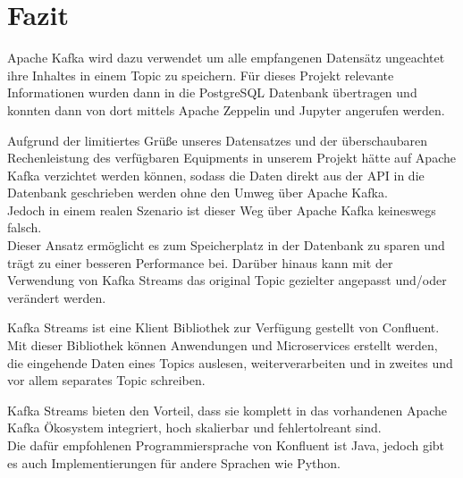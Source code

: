 \chapter{Fazit}
\label{chap:fazit}


Apache Kafka wird dazu verwendet um alle empfangenen Datensätz ungeachtet ihre Inhaltes in einem Topic zu speichern.
Für dieses Projekt relevante Informationen wurden dann in die PostgreSQL Datenbank übertragen und konnten dann von dort mittels
Apache Zeppelin und Jupyter angerufen werden.

Aufgrund der limitiertes Grüße unseres Datensatzes und der überschaubaren Rechenleistung des verfügbaren Equipments in unserem Projekt
hätte auf Apache Kafka verzichtet werden können, sodass die Daten direkt aus der \ac{API} in die Datenbank geschrieben werden
ohne den \glqq Umweg\grqq{} über Apache Kafka.\\
Jedoch in einem realen Szenario ist dieser Weg über Apache Kafka keineswegs falsch.\\
Dieser Ansatz ermöglicht es zum Speicherplatz in der Datenbank zu sparen und trägt zu einer besseren Performance bei.
Darüber hinaus kann mit der Verwendung von Kafka Streams das original Topic gezielter angepasst und/oder verändert werden.

Kafka Streams ist eine Klient Bibliothek zur Verfügung gestellt von Confluent.
Mit dieser Bibliothek können Anwendungen und Microservices erstellt werden, die eingehende Daten eines Topics
auslesen, weiterverarbeiten und in zweites und vor allem separates Topic schreiben.

Kafka Streams bieten den Vorteil, dass sie komplett in das vorhandenen Apache Kafka Ökosystem integriert,
hoch skalierbar und fehlertolreant sind.\\
Die dafür empfohlenen Programmiersprache von Konfluent ist Java,
jedoch gibt es auch Implementierungen für andere Sprachen wie \zb{} Python.\autocite{KafkaStreams}

